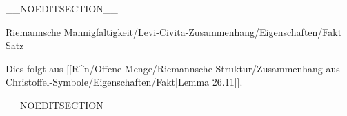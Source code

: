 __NOEDITSECTION__

{Riemannsche Mannigfaltigkeit/Levi-Civita-Zusammenhang/Eigenschaften/Fakt}
{Satz}
{}
{

\faktzusatz {}
\faktzusatz {}

}
{

Dies folgt aus
[[R^n/Offene Menge/Riemannsche Struktur/Zusammenhang aus Christoffel-Symbole/Eigenschaften/Fakt|Lemma 26.11]].

}

__NOEDITSECTION__

